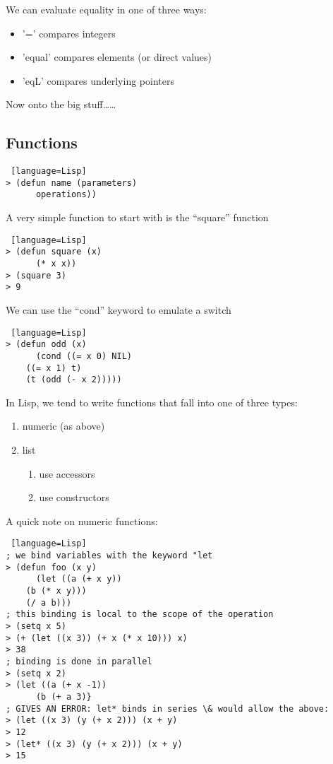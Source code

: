 \documentclass[../../lecture_notes.tex]{subfiles}
\begin{document}
\noindent We can evaluate equality in one of three ways:\\
\begin{itemize}
	\item '=' compares integers
	\item 'equal' compares elements (or direct values)
    	\item 'eqL' compares underlying pointers
\end{itemize} \medskip

\noindent Now onto the big stuff……
\subsection*{Functions}
\begin{lstlisting} [language=Lisp]
> (defun name (parameters)
      operations))
\end{lstlisting} \medskip

\noindent A very simple function to start with is the “square” function
\begin{lstlisting} [language=Lisp]
> (defun square (x)
      (* x x))
> (square 3)
> 9
\end{lstlisting} \medskip

\noindent We can use the “cond” keyword to emulate a switch
\begin{lstlisting} [language=Lisp]
> (defun odd (x)
      (cond ((= x 0) NIL)
	((= x 1) t)
	(t (odd (- x 2)))))
\end{lstlisting} \medskip

\noindent In Lisp, we tend to write functions that fall into one of three types:
\begin{enumerate}
	\item numeric (as above)
	\item list
	\begin{enumerate}
		\item use accessors
		\item use constructors
	\end{enumerate}
\end{enumerate} \medskip

\noindent A quick note on numeric functions:
\begin{lstlisting} [language=Lisp]
; we bind variables with the keyword "let
> (defun foo (x y)
      (let ((a (+ x y))
	(b (* x y)))
	(/ a b)))
; this binding is local to the scope of the operation
> (setq x 5)
> (+ (let ((x 3)) (+ x (* x 10))) x)
> 38
; binding is done in parallel
> (setq x 2)
> (let ((a (+ x -1))
      (b (+ a 3)}
; GIVES AN ERROR: let* binds in series \& would allow the above:
> (let ((x 3) (y (+ x 2))) (x + y)
> 12
> (let* ((x 3) (y (+ x 2))) (x + y)
> 15
\end{lstlisting} \medskip
\end{document}
